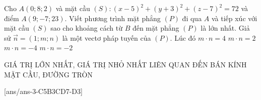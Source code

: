 \begin{ex}%
	Cho $A(0; 8; 2)$ và mặt cầu $(S)\colon (x-5)^2+(y+3)^2+(z-7)^2=72$ và điểm $A(9;-7; 23)$. Viết phương trình mặt phẳng $(P)$ đi qua $A$ và tiếp xúc với mặt cầu $(S)$ sao cho khoảng cách từ $B$ đến mặt phẳng $(P)$ là lớn nhất. Giả sử $\vec{n}=(1; m; n)$ là một vectơ pháp tuyến của $(P)$. Lúc đó
	\choice
	{$m\cdot n=4$}
	{$m\cdot n=2$}
	{\True $m\cdot n=-4$}
	{$m\cdot n=-2$}
\end{ex}
\begin{dang}{GIÁ TRỊ LỚN NHẤT, GIÁ TRỊ NHỎ NHẤT LIÊN QUAN ĐẾN BÁN KÍNH MẶT CẦU, ĐƯỜNG TRÒN}
\end{dang}
[ans/ans-3-C5B3CD7-D3]
\TN
